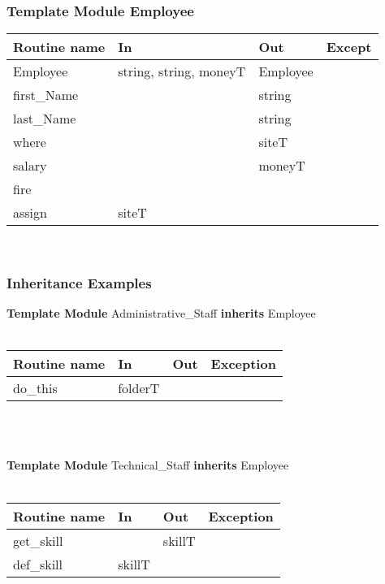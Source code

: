 \documentclass[t,12pt,numbers,fleqn,handout]{beamer}
\begin{document}

\begin{frame}
\frametitle{Template Module Employee}

\begin{tabular}{| l | l | l | l |}
\hline
\textbf{Routine name} & \textbf{In} & \textbf{Out} & \textbf{Except}\\
\hline
Employee & string, string, moneyT & Employee & ~\\
\hline
first\_Name & ~ & string & ~\\
\hline
last\_Name & ~ & string & ~\\
\hline
where & ~ & siteT & ~\\
\hline
salary & ~ & moneyT & ~\\
\hline
fire & ~ & ~ & ~\\
\hline
assign & siteT & ~ & ~\\
\hline
\end{tabular}\\

\end{frame}


\begin{frame}
\frametitle{Inheritance Examples}

\textbf{Template Module}
Administrative\_Staff \textbf{inherits} Employee\\
~\newline

\begin{tabular}{| l | l | l | l |}
\hline
\textbf{Routine name} & \textbf{In} & \textbf{Out} & \textbf{Exception}\\
\hline
do\_this & folderT & ~ & ~\\
\hline
\end{tabular}\\
~\newline

\textbf{Template Module}
Technical\_Staff \textbf{inherits} Employee\\
~\newline

\begin{tabular}{| l | l | l | l |}
\hline
\textbf{Routine name} & \textbf{In} & \textbf{Out} & \textbf{Exception}\\
\hline
get\_skill & ~ & skillT & ~\\
\hline
def\_skill & skillT & ~ & ~\\
\hline
\end{tabular}\\

\end{frame}
\end{document}
